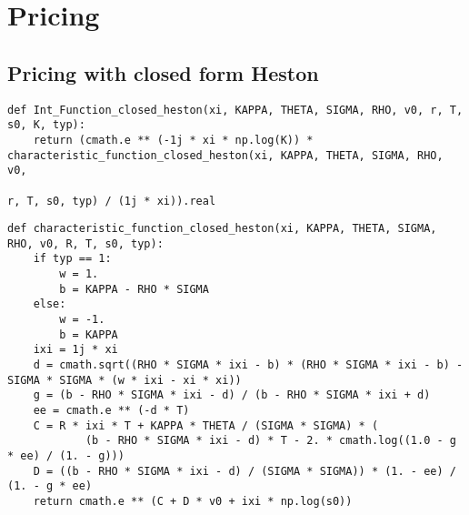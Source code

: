 \section{Pricing}

\subsection{Pricing with closed form Heston}
\begin{Verbatim}[fontsize=\tiny]
def Int_Function_closed_heston(xi, KAPPA, THETA, SIGMA, RHO, v0, r, T, s0, K, typ):
    return (cmath.e ** (-1j * xi * np.log(K)) * characteristic_function_closed_heston(xi, KAPPA, THETA, SIGMA, RHO, v0,
                                                                                      r, T, s0, typ) / (1j * xi)).real
\end{Verbatim}

\begin{Verbatim}[fontsize=\tiny]
def characteristic_function_closed_heston(xi, KAPPA, THETA, SIGMA, RHO, v0, R, T, s0, typ):
    if typ == 1:
        w = 1.
        b = KAPPA - RHO * SIGMA
    else:
        w = -1.
        b = KAPPA
    ixi = 1j * xi
    d = cmath.sqrt((RHO * SIGMA * ixi - b) * (RHO * SIGMA * ixi - b) - SIGMA * SIGMA * (w * ixi - xi * xi))
    g = (b - RHO * SIGMA * ixi - d) / (b - RHO * SIGMA * ixi + d)
    ee = cmath.e ** (-d * T)
    C = R * ixi * T + KAPPA * THETA / (SIGMA * SIGMA) * (
            (b - RHO * SIGMA * ixi - d) * T - 2. * cmath.log((1.0 - g * ee) / (1. - g)))
    D = ((b - RHO * SIGMA * ixi - d) / (SIGMA * SIGMA)) * (1. - ee) / (1. - g * ee)
    return cmath.e ** (C + D * v0 + ixi * np.log(s0))
\end{Verbatim}

